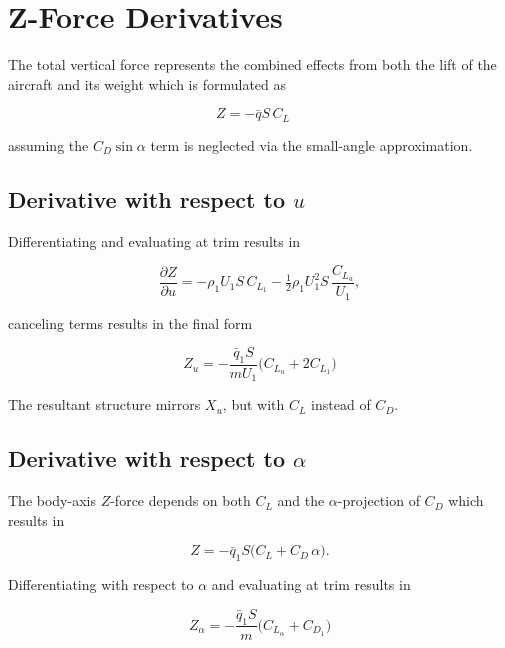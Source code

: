 \documentclass[11pt]{article}
\newcommand{\qbar}{\bar{q}}
\newcommand{\dd}[2]{\dfrac{\partial #1}{\partial #2}}
\begin{document}
\section{Z-Force Derivatives}

The total vertical force represents the combined effects from both the lift of the aircraft and its weight which
is formulated as

\begin{equation}\label{eq:equation_11}
Z = -\qbar S\,C_L \quad
\end{equation}

assuming the $C_{D} \sin\alpha$ term is neglected via the small-angle approximation.

\subsection{Derivative with respect to $u$}

Differentiating and evaluating at trim results in

\begin{equation}\label{eq:equation_12}
\dd{Z}{u} = -\rho_1 U_1 S\,C_{L_1} - \tfrac{1}{2}\rho_1 U_1^2 S\,\frac{C_{L_u}}{U_1},
\end{equation}

canceling terms results in the final form

\begin{equation}\label{eq:equation_13}
\boxed{\;Z_u = -\frac{\qbar_1 S}{mU_1}\bigl(C_{L_u} + 2C_{L_1}\bigr)\;}
\end{equation}

The resultant structure mirrors $X_u$, but with $C_L$ instead of $C_D$.

\subsection{Derivative with respect to $\alpha$}

The body-axis $Z$-force depends on both $C_L$ and the $\alpha$-projection of $C_D$ which results in

\begin{equation}\label{eq:equation_14}
Z = -\qbar_1 S\bigl(C_L + C_D\,\alpha\bigr).
\end{equation}

Differentiating with respect to $\alpha$ and evaluating at trim results in

\begin{equation}\label{eq:equation_15}
\boxed{\;Z_\alpha = -\frac{\qbar_1 S}{m}\bigl(C_{L_\alpha} + C_{D_1}\bigr)\;}
\end{equation}
\end{document}
